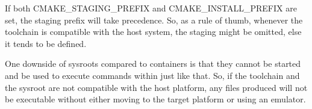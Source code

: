 \begin{tcolorbox}[colback=blue!5!white,colframe=blue!75!black,title=CMAKE\_STAGING\_PREFIX and CMAKE\_INSTALL\_PREFIX]
If both CMAKE\_STAGING\_PREFIX and CMAKE\_INSTALL\_PREFIX are set, the staging prefix will take precedence. So, as a rule of thumb, whenever the toolchain is compatible with the host system, the staging might be omitted, else it tends to be defined.
\end{tcolorbox}

One downside of sysroots compared to containers is that they cannot be started and be used to execute commands within just like that. So, if the toolchain and the sysroot are not compatible with the host platform, any files produced will not be executable without either moving to the target platform or using an emulator.





























